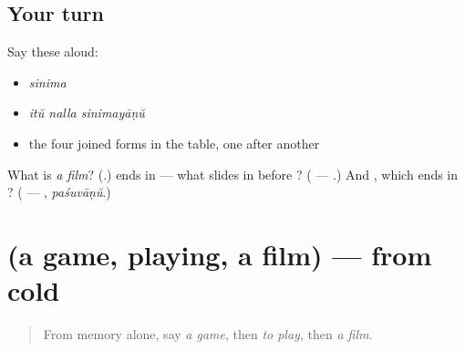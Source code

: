 \subsection*{Your turn}
Say these aloud:

\begin{itemize}
\raggedright
  \item \emph{sinima}
  \item \emph{itŭ nalla sinimayāṇŭ}
  \item the four joined forms in the table, one after another
\end{itemize}

\begin{tcolorbox}[breakable,colback=teal!4,colframe=teal!35!black,title={Before you move on}]
What is \emph{a film}? (\textbf{}.) \textbf{} ends in \textbf{} — what slides in before \textbf{}? (\textbf{} — \textbf{}.) And \textbf{}, which ends in \textbf{}? (\textbf{} — \textbf{}, \emph{paśuvāṇŭ}.)
\end{tcolorbox}
\section[(a game, playing, a film)]{(a game, playing, a film) — from cold}

\label{lesson:ML-R98-leisure-recall}



\begin{quote}
From memory alone, say \emph{a game}, then \emph{to play}, then \emph{a film}.
\end{quote}

